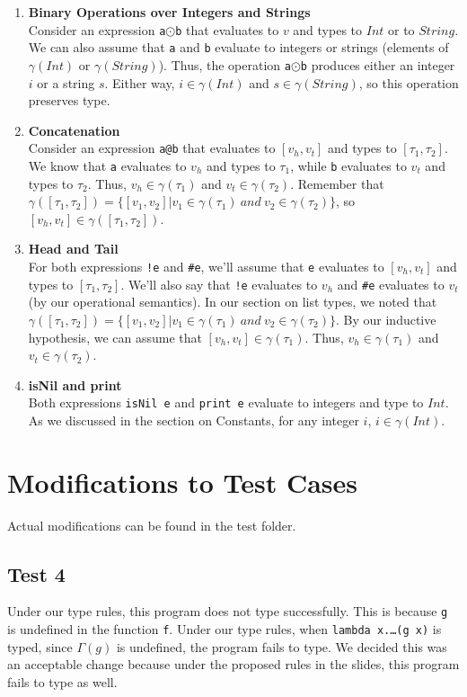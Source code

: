 \documentclass[12pt]{article}
\newcommand{\G}{\Gamma}
\begin{document}
\begin{enumerate}
\item \textbf{Binary Operations over Integers and Strings}\\
Consider an expression \texttt{a$\odot$b} that evaluates to $v$ and types to $Int$ or to $String$. We can also assume that \texttt{a} and \texttt{b} evaluate to integers or strings (elements of $\gamma(Int)$ or $\gamma(String)$). Thus, the operation \texttt{a$\odot$b} produces either an integer $i$ or a string $s$. Either way, $i\in\gamma(Int)$ and $s\in\gamma(String)$, so this operation preserves type.

\item \textbf{Concatenation}\\
Consider an expression \texttt{a@b} that evaluates to $[v_h, v_t]$ and types to $[\tau_1, \tau_2]$. We know that \texttt{a} evaluates to $v_h$ and types to $\tau_1$, while \texttt{b} evaluates to $v_t$ and types to $\tau_2$. Thus, $v_h\in\gamma(\tau_1)$ and $v_t\in\gamma(\tau_2)$. Remember that $\gamma([\tau_1, \tau_2]) = \{[v_1, v_2] | v_1\in\gamma(\tau_1)\ and\ v_2\in\gamma(\tau_2)\}$, so $[v_h, v_t]\in\gamma([\tau_1, \tau_2])$.

\item \textbf{Head and Tail}\\
For both expressions \texttt{!e} and \texttt{\#e}, we'll assume that \texttt{e} evaluates to $[v_h, v_t]$ and types to $[\tau_1, \tau_2]$. We'll also say that \texttt{!e} evaluates to $v_h$ and \texttt{\#e} evaluates to $v_t$ (by our operational semantics). In our section on list types, we noted that $\gamma([\tau_1, \tau_2]) = \{[v_1, v_2] | v_1\in\gamma(\tau_1)\ and\ v_2\in\gamma(\tau_2)\}$. By our inductive hypothesis, we can assume that $[v_h, v_t]\in\gamma(\tau_1)$. Thus, $v_h\in\gamma(\tau_1)$ and $v_t\in\gamma(\tau_2)$.

\item \textbf{isNil and print}\\
Both expressions \texttt{isNil e} and \texttt{print e} evaluate to integers and type to $Int$. As we discussed in the section on Constants, for any integer $i$, $i\in\gamma(Int)$.

\end{enumerate}

\section{Modifications to Test Cases}
Actual modifications can be found in the test folder.

\subsection{Test 4}
Under our type rules, this program does not type successfully. This is because \texttt{g} is undefined in the function \texttt{f}. Under our type rules, when \texttt{lambda x.\hspace{0.05in}\dots\hspace{0.05in}(g x)} is typed, since $\G(g)$ is undefined, the program fails to type. We decided this was an acceptable change because under the proposed rules in the slides, this program fails to type as well.
\end{document}
